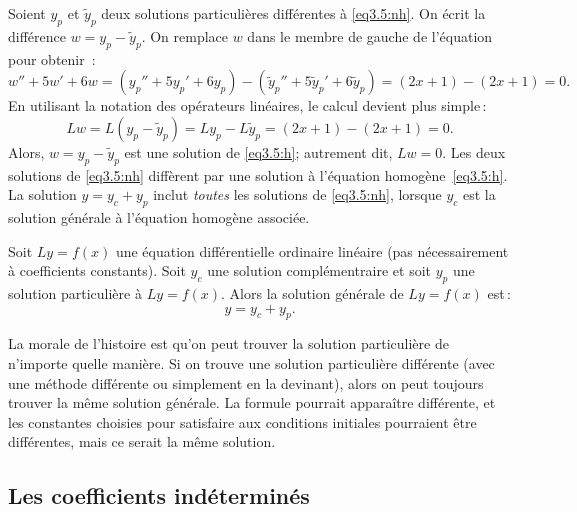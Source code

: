 Soient $y_p$ et $\tilde{y}_p$ deux solutions particulières différentes à \eqref{eq3.5:nh}.
On écrit la différence
$w = y_p - \tilde{y}_p$.  On remplace $w$
dans le membre de gauche de l'équation pour obtenir \,: 
\begin{equation*}
w'' + 5w'+ 6w =
(y_p'' + 5y_p'+ 6y_p) -
(\tilde{y}_p'' + 5\tilde{y}_p'+ 6\tilde{y}_p) =
(2x+1) - (2x+1) = 0 .
\end{equation*}
En utilisant la notation des opérateurs linéaires, le calcul devient plus simple\,:  
\begin{equation*}
Lw = L(y_p - \tilde{y}_p) =
Ly_p - L\tilde{y}_p =
(2x+1)-(2x+1) = 0 .
\end{equation*}
Alors, $w = y_p - \tilde{y}_p$ est une solution de \eqref{eq3.5:h}; autrement dit,
$Lw = 0$.  Les deux solutions de \eqref{eq3.5:nh} diffèrent par une solution à l'équation homogène~\eqref{eq3.5:h}.  La solution  $y = y_c + y_p$ inclut \emph{toutes} les
solutions de \eqref{eq3.5:nh},
lorsque $y_c$ est la solution générale à l'équation homogène associée. 

\begin{theorem}
Soit $Ly=f(x)$ une équation différentielle ordinaire linéaire (pas nécessairement à coefficients constants).  Soit  $y_c$ une solution complémentraire et soit $y_p$ une solution particulière à $Ly=f(x)$.  Alors la solution générale de $Ly=f(x)$ est\,: 
\begin{equation*}
y = y_c + y_p.
\end{equation*}
\end{theorem}

La morale de l'histoire est qu'on peut trouver la solution particulière de n'importe quelle manière. Si on trouve une solution particulière différente (avec une méthode différente ou simplement en la devinant), alors on peut toujours trouver la même solution générale. La formule pourrait apparaître différente, et les constantes choisies pour satisfaire aux conditions initiales pourraient être différentes, mais ce serait la même solution.  

\subsection{Les coefficients indéterminés}


